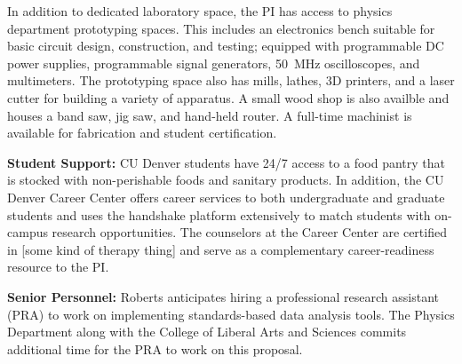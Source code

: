 \documentclass[11pt]{article}
\def\ni{\noindent}
\def\ms{\medskip}
\newcommand{\RnD}{{\small R\&D}}
\begin{document}
\ni {\bf Prototyping Facilities:} In addition to dedicated laboratory space, the PI has access to physics department prototyping spaces.  This includes an electronics bench suitable for basic circuit design, construction, and testing; equipped with programmable DC power supplies, programmable signal generators, 50~MHz oscilloscopes, and multimeters.  The prototyping space also has mills, lathes, 3D printers, and a laser cutter for building a variety of apparatus.  A small wood shop is also availble and houses a band saw, jig saw, and hand-held router.  A full-time machinist is available for fabrication and student certification.

{\bf Student Support:}  CU Denver students have 24/7 access to a food pantry that is stocked with non-perishable foods and sanitary products.  In addition, the CU Denver Career Center offers career services to both undergraduate and graduate students and uses the handshake platform extensively to match students with on-campus research opportunities.  The counselors at the Career Center are certified in [some kind of therapy thing] and serve as a complementary career-readiness resource to the PI.


\ni
{\bf Senior Personnel:} Roberts anticipates hiring a professional research assistant (PRA) to work on implementing standards-based data analysis tools.  The Physics Department along with the College of Liberal Arts and Sciences commits additional time for the PRA to work on this proposal.
\end{document}
